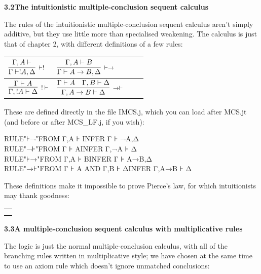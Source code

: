 \documentclass[11pt]{book}
\newcommand{\tab}{\hspace{5mm}}
\newcommand{\reason}[1]{\scalebox{0.85}{#1}}
\begin{document}
\textbf{{\large 3.2\tab The intuitionistic multiple-conclusion sequent calculus}}


The rules of the intuitionistic multiple-conclusion sequent calculus aren't simply additive, but they use little more than specialised weakening. The calculus is just that of chapter 2, with different definitions of a few rules:\\


\begin{tabular}{|p{2.207in}|p{2.207in}|p{0.043in}|p{0.043in}|}
\hline
{\raggedright 
$\infer[\reason{$ |- !$}]
       {\Gamma  |- !A,\Delta }
       {\Gamma,A |- }$
} & 
{\raggedright 
$\infer[\reason{$ |- ->
$}]
       {\Gamma  |- A->B,\Delta }
       {\Gamma,A |- B}$
}\\
\hline
{\raggedright 
$\infer[\reason{$!|- $}]
       {\Gamma,!A |- \Delta }
       {\Gamma  |- A}$
} & 
{\raggedright 
$\infer[\reason{$->|- $}]
       {\Gamma,A-> B |- \Delta }
       {\Gamma  |- A\quad \Gamma,B |- \Delta }$
}\\
\hline
\end{tabular}


These are defined directly in the file IMCS.j, which you can load after MCS.jt (and before or after MCS\_LF.j, if you wish):

RULE\tab "⊦¬"\tab FROM Γ,A ⊦ \tab INFER Γ ⊦ 
¬A,Δ\\
RULE\tab "¬⊦"\tab FROM Γ ⊦ A\tab INFER Γ,¬A 
⊦ Δ\\
RULE\tab "⊦→"\tab FROM Γ,A ⊦ B\tab INFER Γ ⊦ A→B,Δ\\
RULE\tab "→⊦"\tab FROM Γ ⊦ A AND Γ,B ⊦ Δ\tab INFER 
Γ,A→B ⊦ Δ


These definitions make it impossible to prove Pierce's law, for which intuitionists may thank goodness:\\


\begin{tabular}{|p{1.778in}|}
\hline
{\raggedright }\\
\hline
{\raggedright }\\
\hline
{\raggedright }\\
\hline
\end{tabular}


\textbf{{\large 3.3\tab A multiple-conclusion sequent calculus with multiplicative rules}}


The logic is just the normal multiple-conclusion calculus, with all of the branching rules written in multiplicative style; we have chosen at the same time to use an axiom rule which doesn't ignore unmatched conclusions:\\
\end{document}
